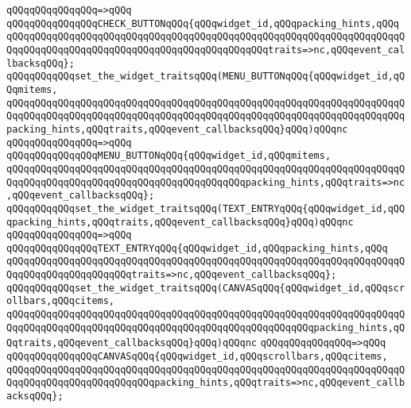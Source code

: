 \verb|qQQqqQQqqQQqqQQq=>qQQq|\newline
\verb|qQQqqQQqqQQqqQQqCHECK_BUTTONqQQq{qQQqwidget_id,qQQqpacking_hints,qQQq|\newline
\verb|qQQqqQQqqQQqqQQqqQQqqQQqqQQqqQQqqQQqqQQqqQQqqQQqqQQqqQQqqQQqqQQqqQQqqQQqqQQqqQQqqQQqqQQqqQQqqQQqqQQqqQQqqQQqqQQqqQQqtraits=>nc,qQQqevent_callbacksqQQq};|\newline
\newline
\verb|qQQqqQQqqQQqset_the_widget_traitsqQQq(MENU_BUTTONqQQq{qQQqwidget_id,qQQqmitems,|\newline
\verb|qQQqqQQqqQQqqQQqqQQqqQQqqQQqqQQqqQQqqQQqqQQqqQQqqQQqqQQqqQQqqQQqqQQqqQQqqQQqqQQqqQQqqQQqqQQqqQQqqQQqqQQqqQQqqQQqqQQqqQQqqQQqqQQqqQQqqQQqqQQqpacking_hints,qQQqtraits,qQQqevent_callbacksqQQq}qQQq)qQQqnc|\newline
\verb|qQQqqQQqqQQqqQQq=>qQQq|\newline
\verb|qQQqqQQqqQQqqQQqMENU_BUTTONqQQq{qQQqwidget_id,qQQqmitems,|\newline
\verb|qQQqqQQqqQQqqQQqqQQqqQQqqQQqqQQqqQQqqQQqqQQqqQQqqQQqqQQqqQQqqQQqqQQqqQQqqQQqqQQqqQQqqQQqqQQqqQQqqQQqqQQqqQQqqQQqpacking_hints,qQQqtraits=>nc,qQQqevent_callbacksqQQq};|\newline
\newline
\verb|qQQqqQQqqQQqset_the_widget_traitsqQQq(TEXT_ENTRYqQQq{qQQqwidget_id,qQQqpacking_hints,qQQqtraits,qQQqevent_callbacksqQQq}qQQq)qQQqnc|\newline
\verb|qQQqqQQqqQQqqQQq=>qQQq|\newline
\verb|qQQqqQQqqQQqqQQqTEXT_ENTRYqQQq{qQQqwidget_id,qQQqpacking_hints,qQQq|\newline
\verb|qQQqqQQqqQQqqQQqqQQqqQQqqQQqqQQqqQQqqQQqqQQqqQQqqQQqqQQqqQQqqQQqqQQqqQQqqQQqqQQqqQQqqQQqqQQqtraits=>nc,qQQqevent_callbacksqQQq};|\newline
\newline
\verb|qQQqqQQqqQQqset_the_widget_traitsqQQq(CANVASqQQq{qQQqwidget_id,qQQqscrollbars,qQQqcitems,|\newline
\verb|qQQqqQQqqQQqqQQqqQQqqQQqqQQqqQQqqQQqqQQqqQQqqQQqqQQqqQQqqQQqqQQqqQQqqQQqqQQqqQQqqQQqqQQqqQQqqQQqqQQqqQQqqQQqqQQqqQQqqQQqqQQqpacking_hints,qQQqtraits,qQQqevent_callbacksqQQq}qQQq)qQQqnc|\newline
\verb|qQQqqQQqqQQqqQQq=>qQQq|\newline
\verb|qQQqqQQqqQQqqQQqCANVASqQQq{qQQqwidget_id,qQQqscrollbars,qQQqcitems,|\newline
\verb|qQQqqQQqqQQqqQQqqQQqqQQqqQQqqQQqqQQqqQQqqQQqqQQqqQQqqQQqqQQqqQQqqQQqqQQqqQQqqQQqqQQqqQQqqQQqqQQqpacking_hints,qQQqtraits=>nc,qQQqevent_callbacksqQQq};|\newline
